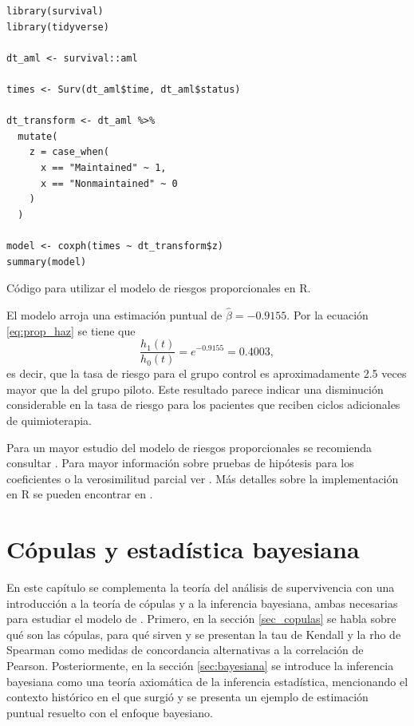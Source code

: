 \documentclass[11pt,a4paper]{article}
\begin{document}
\begin{table}[htb]
\begin{lstlisting}
library(survival)
library(tidyverse)

dt_aml <- survival::aml

times <- Surv(dt_aml$time, dt_aml$status)

dt_transform <- dt_aml %>%
  mutate(
    z = case_when(
      x == "Maintained" ~ 1,
      x == "Nonmaintained" ~ 0
    )
  )

model <- coxph(times ~ dt_transform$z)
summary(model)
\end{lstlisting}
\caption{Código para utilizar el modelo de riesgos proporcionales en R.}
\label{cod:coxph}
\end{table}

\newpage

El modelo arroja una estimación puntual de $\hat{\beta} = -0.9155$. Por la ecuación \eqref{eq:prop_haz} se tiene que $$\frac{h_1(t)}{h_0(t)} = e^{-0.9155} = 0.4003,$$ es decir, que la tasa de riesgo para el grupo control es aproximadamente 2.5 veces mayor que la del grupo piloto. Este resultado parece indicar una disminución considerable en la tasa de riesgo para los pacientes que reciben ciclos adicionales de quimioterapia.

\newpage

Para un mayor estudio del modelo de riesgos proporcionales se recomienda consultar \citet{cox}. Para mayor información sobre pruebas de hipótesis para los coeficientes o la verosimilitud parcial ver \citet{klein}. Más detalles sobre la implementación en R se pueden encontrar en \citet{moore}.

\newpage
\clearpage

\section{Cópulas y estadística bayesiana}

En este capítulo se complementa la teoría del análisis de supervivencia con una introducción a la teoría de cópulas y a la inferencia bayesiana, ambas necesarias para estudiar el modelo de \citet{nieto}. Primero, en la sección \ref{sec_copulas} se habla sobre qué son las cópulas, para qué sirven y se presentan la tau de Kendall y la rho de Spearman como medidas de concordancia alternativas a la correlación de Pearson. Posteriormente, en la sección \ref{sec:bayesiana} se introduce la inferencia bayesiana como una teoría axiomática de la inferencia estadística, mencionando el contexto histórico en el que surgió y se presenta un ejemplo de estimación puntual resuelto con el enfoque bayesiano.
\end{document}
